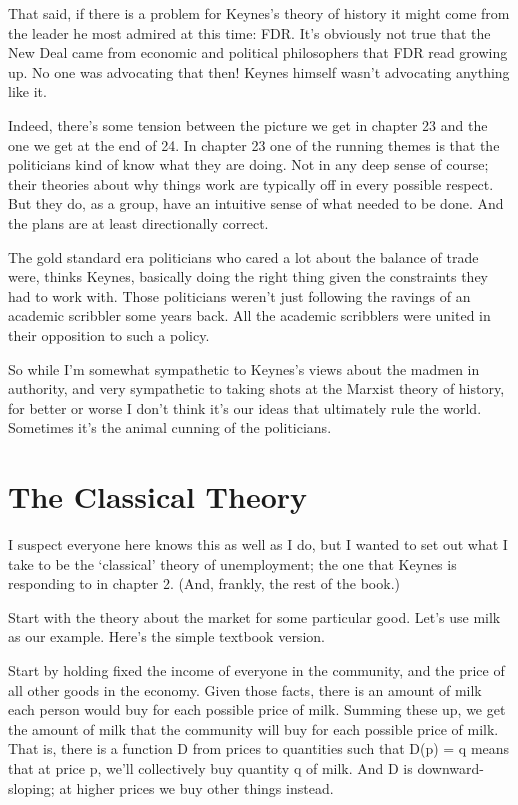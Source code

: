 \documentclass[
  11pt,
  letterpaper,
  DIV=11,
  numbers=noendperiod,
  oneside]{scrartcl}
\begin{document}
That said, if there is a problem for Keynes's theory of history it might
come from the leader he most admired at this time: FDR. It's obviously
not true that the New Deal came from economic and political philosophers
that FDR read growing up. No one was advocating that then! Keynes
himself wasn't advocating anything like it.

Indeed, there's some tension between the picture we get in chapter 23
and the one we get at the end of 24. In chapter 23 one of the running
themes is that the politicians kind of know what they are doing. Not in
any deep sense of course; their theories about why things work are
typically off in every possible respect. But they do, as a group, have
an intuitive sense of what needed to be done. And the plans are at least
directionally correct.

The gold standard era politicians who cared a lot about the balance of
trade were, thinks Keynes, basically doing the right thing given the
constraints they had to work with. Those politicians weren't just following the ravings of an
academic scribbler some years back. All the academic scribblers were
united in their opposition to such a policy.

So while I'm somewhat sympathetic to Keynes's views about the madmen in
authority, and very sympathetic to taking shots at the Marxist theory of
history, for better or worse I don't think it's our ideas that
ultimately rule the world. Sometimes it's the animal cunning of the
politicians.

\section{The Classical Theory}\label{the-classical-theory}

I suspect everyone here knows this as well as I do, but I wanted to set
out what I take to be the `classical' theory of unemployment; the one
that Keynes is responding to in chapter 2. (And, frankly, the rest of
the book.)

Start with the theory about the market for some particular good. Let's
use milk as our example. Here's the simple textbook version.

Start by holding fixed the income of everyone in the community, and the
price of all other goods in the economy. Given those facts, there is an
amount of milk each person would buy for each possible price of milk.
Summing these up, we get the amount of milk that the community will buy
for each possible price of milk. That is, there is a function D from
prices to quantities such that D(p) = q means that at price p, we'll
collectively buy quantity q of milk. And D is downward-sloping; at
higher prices we buy other things instead.
\end{document}
